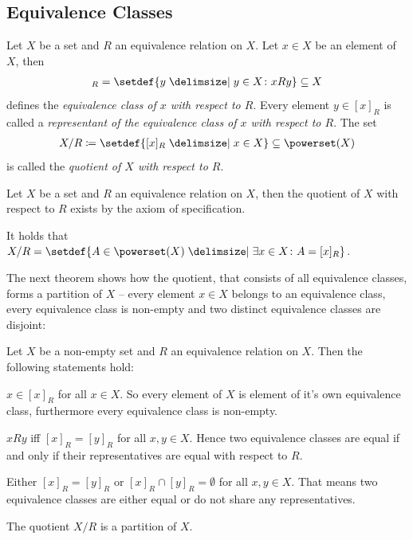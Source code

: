 \subsection{Equivalence Classes}

\begin{definition}
    Let $X$ be a set and $R$ an equivalence relation on $X$. Let $x\in X$ be an element of $X$, then
    \begin{align}[x]_R=\setdef{y\given y\in X\colon x R y}\subseteq X\end{align}
    defines the \emph{equivalence class of $x$ with respect to $R$}. Every element $y\in[x]_R$ is called a \emph{representant of the equivalence class of $x$ with respect to $R$}. The set
    \begin{align}X/R\coloneq\setdef{[x]_R\given x\in X}\subseteq \powerset(X)\end{align}
    is called the \emph{quotient of $X$ with respect to $R$}.
\end{definition}

\begin{remarks}
    \begin{remarkenumerate}
        \item Let $X$ be a set and $R$ an equivalence relation on $X$, then the quotient of $X$ with respect to $R$ exists by the axiom of specification.
        \begin{miniproof}
            It holds that $X/R=\setdef{A\in\powerset(X)\given \exists x\in X\colon A=[x]_R}$.
        \end{miniproof}
    \end{remarkenumerate}
\end{remarks}

The next theorem shows how the quotient, that consists of all equivalence classes, forms a partition of $X$ -- every element $x\in X$ belongs to an equivalence class, every equivalence class is non-empty and two distinct equivalence classes are disjoint:

\begin{theorem}
    Let $X$ be a non-empty set and $R$ an equivalence relation on $X$. Then the following statements hold:
    \begin{intheoremenumerate}
        \item $x\in[x]_R$ for all $x\in X$. So every element of $X$ is element of it's own equivalence class, furthermore every equivalence class is non-empty.
        \item $xRy$ iff $[x]_R=[y]_R$ for all $x,y\in X$. Hence two equivalence classes are equal if and only if their representatives are equal with respect to $R$.
        \item Either $[x]_R=[y]_R$ or $[x]_R\cap [y]_R=\emptyset$ for all $x,y\in X$. That means two equivalence classes are either equal or do not share any representatives.
        \item\label{theorem:relations:quotient_is_partition} The quotient $X/R$ is a partition of $X$.
    \end{intheoremenumerate}
\end{theorem}

